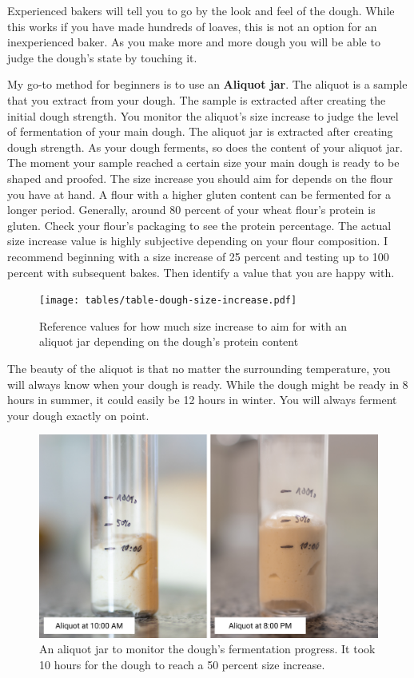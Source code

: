 Experienced bakers will tell you to go by the look and feel of
the dough. While this works if you have made hundreds of loaves,
this is not an option for an inexperienced baker. As
you make more and more dough you will be able to judge
the dough's state by touching it.

My go-to method for beginners is to use an \textbf{Aliquot jar}.
The aliquot is a sample that you extract from your dough. The
sample is extracted after creating the initial dough strength.
You monitor the aliquot's size increase to judge the
level of fermentation of your main dough. The aliquot
jar is extracted after creating dough strength. As your
dough ferments, so does the content of your aliquot jar. The moment your
sample reached a certain size your main dough is ready
to be shaped and proofed. The size increase you should
aim for depends on the flour you have at hand. A flour
with a higher gluten content can be fermented for a
longer period. Generally, around 80 percent
of your wheat flour's protein is gluten. Check your flour's
packaging to see the protein percentage. The actual size increase
value is highly subjective depending on your flour composition.
I recommend beginning with a size increase of 25 percent and testing
up to 100 percent with subsequent bakes. Then identify a value
that you are happy with.

\begin{figure}[!htb]
  \texttt{[image: tables/table-dough-size-increase.pdf]}
  \caption{Reference values for how much size increase to aim for with an aliquot jar depending on the dough's protein content}
\end{figure}

The beauty of the aliquot is that no matter the surrounding
temperature, you will always know when your dough is ready.
While the dough might be ready in 8 hours in summer, it could
easily be 12 hours in winter. You will always ferment your
dough exactly on point.


\begin{figure}[!htb]
  \includegraphics[width=\textwidth]{aliquot-before-after}
  \caption{An aliquot jar to monitor the dough's fermentation progress.
  It took 10 hours for the dough to reach a 50 percent size increase.}
\end{figure}

